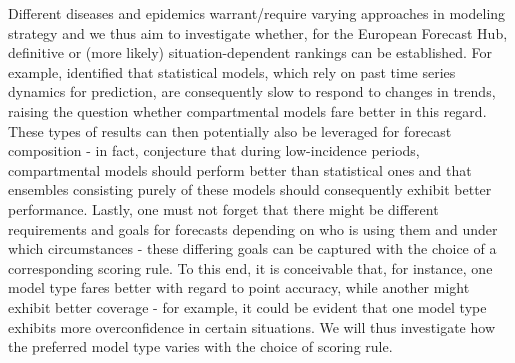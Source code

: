 Different diseases and epidemics warrant/require varying approaches in modeling strategy and we thus aim to investigate 
whether, for the European Forecast Hub, definitive or (more likely) situation-dependent rankings can be established. For example, \cite{bracher_pre-registered_2021} identified that statistical models, which rely on past time series dynamics for prediction, are consequently slow to respond to changes in trends, raising the question whether compartmental models fare better in this regard. These types of results can then potentially also be leveraged for forecast composition - in fact, \cite{taylor_combining_2021} conjecture that during low-incidence periods, compartmental models should perform better than statistical ones and that ensembles consisting purely of these models should consequently exhibit better performance. Lastly, one must not forget that there might be different requirements and goals for forecasts depending on who is using them and under which circumstances - these differing goals can be captured with the choice of  a corresponding scoring rule. To this end, it is conceivable that, for instance, one model type fares better with regard to point accuracy, while another might exhibit better coverage - for example, it could be evident that one model type exhibits more overconfidence in certain situations. We will thus investigate how the preferred model type varies with the choice of scoring rule.\\
